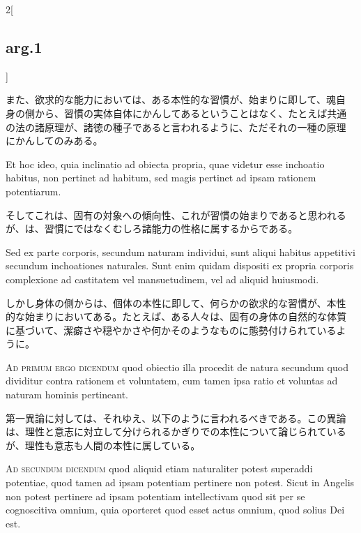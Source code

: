\documentclass[paper=a4paper,fontsize=10pt,jafontsize=9pt,titlepage]{jlreq}
\begin{document}
\begin{paracol}{2}[\subsection{arg.1}]
\switchcolumn

また、欲求的な能力においては、ある本性的な習慣が、始まりに即して、魂自
身の側から、習慣の実体自体にかんしてあるということはなく、たとえば共通
の法の諸原理が、諸徳の種子であると言われるように、ただそれの一種の原理
にかんしてのみある。

\switchcolumn*

Et hoc ideo, quia inclinatio ad obiecta propria, quae videtur esse
inchoatio habitus, non pertinet ad habitum, sed magis pertinet ad
ipsam rationem potentiarum.

\switchcolumn

そしてこれは、固有の対象への傾向性、これが習慣の始まりであると思われる
が、は、習慣にではなくむしろ諸能力の性格に属するからである。

\switchcolumn*

Sed ex parte corporis, secundum naturam individui, sunt aliqui habitus
appetitivi secundum inchoationes naturales. Sunt enim quidam dispositi
ex propria corporis complexione ad castitatem vel mansuetudinem, vel
ad aliquid huiusmodi.

\switchcolumn

しかし身体の側からは、個体の本性に即して、何らかの欲求的な習慣が、本性
的な始まりにおいてある。たとえば、ある人々は、固有の身体の自然的な体質
に基づいて、潔癖さや穏やかさや何かそのようなものに態勢付けられているよ
うに。

\switchcolumn*[\subsection{ad.1}]

{\scshape Ad primum ergo dicendum} quod obiectio illa procedit de
natura secundum quod dividitur contra rationem et voluntatem, cum
tamen ipsa ratio et voluntas ad naturam hominis pertineant.

\switchcolumn

第一異論に対しては、それゆえ、以下のように言われるべきである。この異論
は、理性と意志に対立して分けられるかぎりでの本性について論じられている
が、理性も意志も人間の本性に属している。

\switchcolumn*[\subsection{ad.2}]

{\scshape Ad secundum dicendum} quod aliquid etiam naturaliter potest
superaddi potentiae, quod tamen ad ipsam potentiam pertinere non
potest. Sicut in Angelis non potest pertinere ad ipsam potentiam
intellectivam quod sit per se cognoscitiva omnium, quia oporteret quod
esset actus omnium, quod solius Dei est.


\end{paracol}
\end{document}
